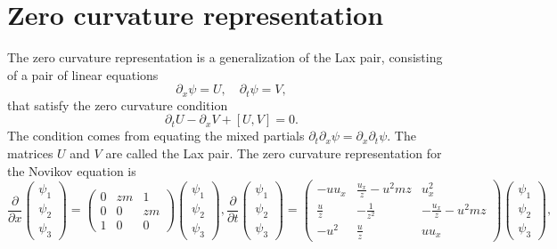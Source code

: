 \documentclass[english,master]{liumaiex}
\theoremstyle{plain}
\theoremstyle{definition}
\begin{document}
\section{Zero curvature representation}

The zero curvature representation is a generalization of the Lax pair, consisting of a pair of linear equations
\begin{equation}
	\partial_x \psi = U, \quad \partial_t \psi = V,
\end{equation}
that satisfy the zero curvature condition
\begin{equation}
	\partial_t U - \partial_x V + [U, V] = 0.
\end{equation}
The condition comes from equating the mixed partials $\partial_t \partial_x \psi = \partial_x \partial_t \psi$. The matrices $U$ and $V$ are called the Lax pair. The zero curvature representation for the Novikov equation\cite{Lundmark_2022} is
\begin{subequations}
  \label{eq:Novikov-lax}
  \begin{equation}
    \label{eq:Novikov-lax-x}
    \frac{\partial}{\partial x}
    \begin{pmatrix} \psi_1 \\ \psi_2 \\ \psi_3 \end{pmatrix} =
    \begin{pmatrix}
      0 & zm & 1 \\
      0 & 0 & zm \\
      1 & 0 & 0
    \end{pmatrix}
    \begin{pmatrix} \psi_1 \\ \psi_2 \\ \psi_3 \end{pmatrix}
    ,
  \end{equation}
  \begin{equation}
    \label{eq:Novikov-lax-t}
    \frac{\partial}{\partial t}
    \begin{pmatrix} \psi_1 \\ \psi_2 \\ \psi_3 \end{pmatrix} =
    \begin{pmatrix}
      -u u_x & \frac{u_x}{z}-u^2 mz & u_x^2 \\
      \frac{u}{z} & - \frac{1}{z^2} & - \frac{u_x}{z} - u^2 mz \\
      -u^2 & \frac{u}{z} & uu_x
    \end{pmatrix}
    \begin{pmatrix} \psi_1 \\ \psi_2 \\ \psi_3 \end{pmatrix}
    ,
  \end{equation}
\end{subequations}
\end{document}

